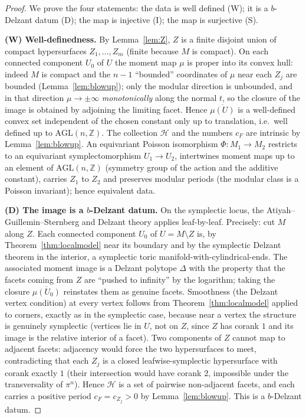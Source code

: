 \documentclass{amsart}
\theoremstyle{definition}
\begin{document}
\begin{proof}
We prove the four statements: the data is well defined (W); it is a $b$-Delzant
datum (D); the map is injective (I); the map is surjective (S).

\medskip
\noindent\textbf{(W) Well-definedness.}
By Lemma~\ref{lem:Z}, $Z$ is a finite disjoint union of compact hypersurfaces
$Z_1,\dots,Z_m$ (finite because $M$ is compact). On each connected component
$U_0$ of $U$ the moment map $\mu$ is proper into its convex hull: indeed $M$ is
compact and the $n-1$ ``bounded'' coordinates of $\mu$ near each $Z_j$ are
bounded (Lemma~\ref{lem:blowup}); only the modular direction is unbounded, and
in that direction $\mu\to\pm\infty$ \emph{monotonically} along the normal $t$,
so the closure of the image is obtained by adjoining the limiting facet. Hence
$\overline{\mu(U)}$ is a well-defined convex set independent of the chosen
constant only up to translation, i.e.\ well defined up to
$\mathrm{AGL}(n,\mathbb Z)$. The collection $\mathcal H$ and the numbers $c_F$
are intrinsic by Lemma~\ref{lem:blowup}. An equivariant Poisson isomorphism
$\Phi\colon M_1\to M_2$ restricts to an equivariant symplectomorphism $U_1\to
U_2$, intertwines moment maps up to an element of $\mathrm{AGL}(n,\mathbb Z)$
(symmetry group of the action and the additive constant), carries $Z_1$ to
$Z_2$ and preserves modular periods (the modular class is a Poisson invariant);
hence equivalent data.

\medskip
\noindent\textbf{(D) The image is a $b$-Delzant datum.}
On the symplectic locus, the Atiyah--Guillemin--Sternberg and Delzant theory
applies leaf-by-leaf. Precisely: cut $M$ along $Z$. Each connected component
$U_0$ of $U=M\setminus Z$ is, by Theorem~\ref{thm:localmodel} near its
boundary and by the symplectic Delzant theorem in the interior, a symplectic
toric manifold-with-cylindrical-ends. The associated moment image is a Delzant
polytope $\Delta$ with the property that the facets coming from $Z$ are
``pushed to infinity'' by the logarithm; taking the closure
$\overline{\mu(U_0)}$ reinstates them as genuine facets. Smoothness
(the Delzant vertex condition) at every vertex follows from
Theorem~\ref{thm:localmodel} applied to corners, exactly as in the symplectic
case, because near a vertex the structure is genuinely symplectic (vertices lie
in $U$, not on $Z$, since $Z$ has corank $1$ and its image is the relative
interior of a facet). Two components of $Z$ cannot map to adjacent facets:
adjacency would force the two hypersurfaces to meet, contradicting that each
$Z_j$ is a closed leafwise-symplectic hypersurface with corank exactly $1$
(their intersection would have corank $2$, impossible under the transversality
of $\pi^n$). Hence $\mathcal H$ is a set of pairwise non-adjacent facets, and
each carries a positive period $c_F=c_{Z_j}>0$ by Lemma~\ref{lem:blowup}. This
is a $b$-Delzant datum.


\end{proof}
\end{document}
